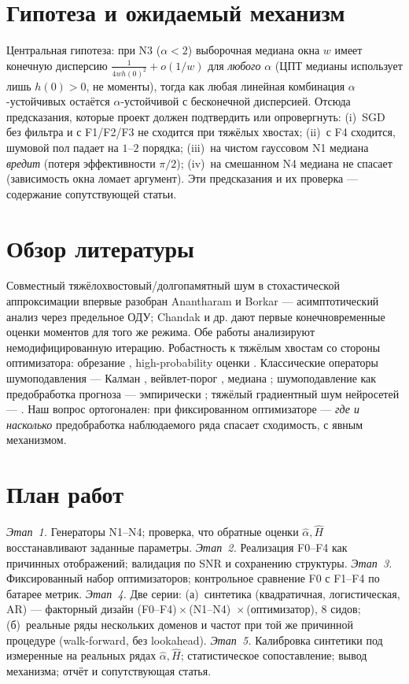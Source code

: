 \documentclass[conference]{IEEEtran}
\begin{document}
\section{Гипотеза и ожидаемый механизм}

Центральная гипотеза: при N3 ($\alpha<2$) выборочная медиана окна
$w$ имеет конечную дисперсию $\tfrac{1}{4wh(0)^2}+o(1/w)$ для
\emph{любого} $\alpha$ (ЦПТ медианы использует лишь $h(0)>0$, не
моменты), тогда как любая линейная комбинация $\alpha$-устойчивых
остаётся $\alpha$-устойчивой с бесконечной дисперсией. Отсюда
предсказания, которые проект должен подтвердить или опровергнуть:
(i)~SGD без фильтра и с F1/F2/F3 не сходится при тяжёлых хвостах;
(ii)~с F4 сходится, шумовой пол падает на $1$--$2$ порядка;
(iii)~на чистом гауссовом N1 медиана \emph{вредит} (потеря
эффективности $\pi/2$); (iv)~на смешанном N4 медиана не спасает
(зависимость окна ломает аргумент). Эти предсказания и их проверка ---
содержание сопутствующей статьи.

\section{Обзор литературы}

Совместный тяжёлохвостовый/долгопамятный шум в стохастической
аппроксимации впервые разобран Anantharam и Borkar
\cite{anantharam2012sa} --- асимптотический анализ через предельное
ОДУ; Chandak и др. \cite{chandak2026hl} дают первые конечновременные
оценки моментов для того же режима. Обе работы анализируют
немодифицированную итерацию. Робастность к тяжёлым хвостам со стороны
оптимизатора: обрезание \cite{gorbunov2020clipping}, high-probability
оценки \cite{cutkosky2021high}. Классические операторы шумоподавления
--- Калман \cite{kalman1960}, вейвлет-порог
\cite{donoho1994wavelets,mallat1999wavelet}, медиана
\cite{yin1996median}; шумоподавление как предобработка прогноза ---
эмпирически \cite{tang2021denoising}; тяжёлый градиентный шум
нейросетей --- \cite{simsekli2019tailindex}. Наш вопрос ортогонален:
при фиксированном оптимизаторе --- \emph{где и насколько} предобработка
наблюдаемого ряда спасает сходимость, с явным механизмом.

\section{План работ}

\textit{Этап~1.} Генераторы N1--N4; проверка, что обратные оценки
$\hat\alpha,\hat H$ восстанавливают заданные параметры.
\textit{Этап~2.} Реализация F0--F4 как причинных отображений;
валидация по SNR и сохранению структуры.
\textit{Этап~3.} Фиксированный набор оптимизаторов; контрольное
сравнение F0 с F1--F4 по батарее метрик.
\textit{Этап~4.} Две серии: (а)~синтетика (квадратичная,
логистическая, AR) --- факторный дизайн (F0--F4)\,$\times$\,(N1--N4)\,
$\times$\,(оптимизатор), $8$ сидов; (б)~реальные ряды нескольких
доменов и частот при той же причинной процедуре (walk-forward, без
lookahead).
\textit{Этап~5.} Калибровка синтетики под измеренные на реальных рядах
$\hat\alpha,\hat H$; статистическое сопоставление; вывод механизма;
отчёт и сопутствующая статья.
\end{document}
